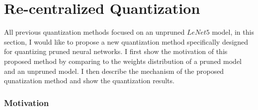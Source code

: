\documentclass[a4paper,12pt]{report}
\begin{document}
\section{Re-centralized Quantization}
All previous quantization methods focused on an unpruned $LeNet5$ model, in this
section, I would like to propose a new quantization method specifically designed
for quantizing pruned neural networks.
I first show the motivation of this proposed method by comparing to the weights
distribution of a pruned model and an unpruned model.
I then describe the mechanism of the proposed qunatization method
and show the quantization results.

\subsubsection{Motivation}
\end{document}
